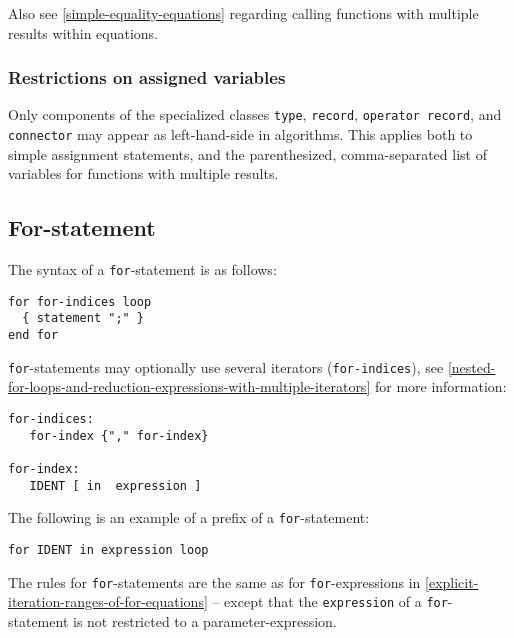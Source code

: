 \begin{nonnormative}
Also see \cref{simple-equality-equations} regarding calling functions with
multiple results within equations.
\end{nonnormative}

\subsubsection{Restrictions on assigned variables}\label{restrictions-on-assigned-variables}

Only components of the specialized classes \lstinline!type!, \lstinline!record!, \lstinline!operator record!, and \lstinline!connector! may appear as left-hand-side in algorithms.
This applies both to simple assignment statements, and the parenthesized, comma-separated list of variables for functions with multiple results.

\subsection{For-statement}\label{for-statement}

The syntax of a \lstinline!for!-statement is as follows:
\begin{lstlisting}[language=grammar]
for for-indices loop
  { statement ";" }
end for
\end{lstlisting}
\lstinline!for!-statements may optionally use several iterators (\lstinline!for-indices!), see \cref{nested-for-loops-and-reduction-expressions-with-multiple-iterators} for more information:
\begin{lstlisting}[language=grammar]
for-indices:
   for-index {"," for-index}

for-index:
   IDENT [ in  expression ]
\end{lstlisting}
The following is an example of a prefix of a \lstinline!for!-statement:
\begin{lstlisting}[language=modelica]
for IDENT in expression loop
\end{lstlisting}
The rules for \lstinline!for!-statements are the same as for \lstinline!for!-expressions in \cref{explicit-iteration-ranges-of-for-equations} -- except that the \lstinline!expression! of a \lstinline!for!-statement is not restricted to a parameter-expression.

